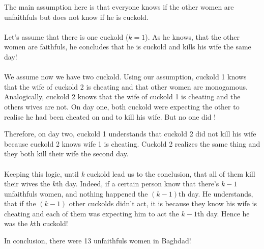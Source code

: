 The main assumption here is that everyone knows if the other women are unfaithfuls but does not know if he is cuckold.

\paragraph{}Let's assume that there is one cuckold ($k = 1$). As he knows, that the other women are faithfuls, he concludes that he is cuckold and kills his wife the same day! 

\paragraph{}We assume now we have two cuckold.
Using our assumption, cuckold 1 knows that the wife of cuckold 2 is cheating and that other women are monogamous. Analogically, cuckold 2 knows that the wife of cuckold 1 is cheating and the others wives are not. On day one, both cuckold were expecting the other to realise he had been cheated on and to kill his wife. But no one did ! 

Therefore, on day two, cuckold 1 understands that cuckold 2 did not kill his wife because cuckold 2 knows wife 1 is cheating. Cuckold 2 realizes the same thing and they both kill their wife the second day.  

\paragraph{}Keeping this logic, until \textit{k} cuckold lead us to the conclusion, that all of them kill their wives the $k$th day. Indeed, if a certain person know that there's $k - 1$ unfaithfuls women, and nothing happened the $(k-1)$th day. He understands, that if the $(k-1)$ other cuckolds didn't act, it is because they know his wife is cheating and each of them was expecting him to act the $k-1$th day. Hence he was the $k$th cuckold!

In conclusion, there were 13 unfaithfuls women in Baghdad! 
